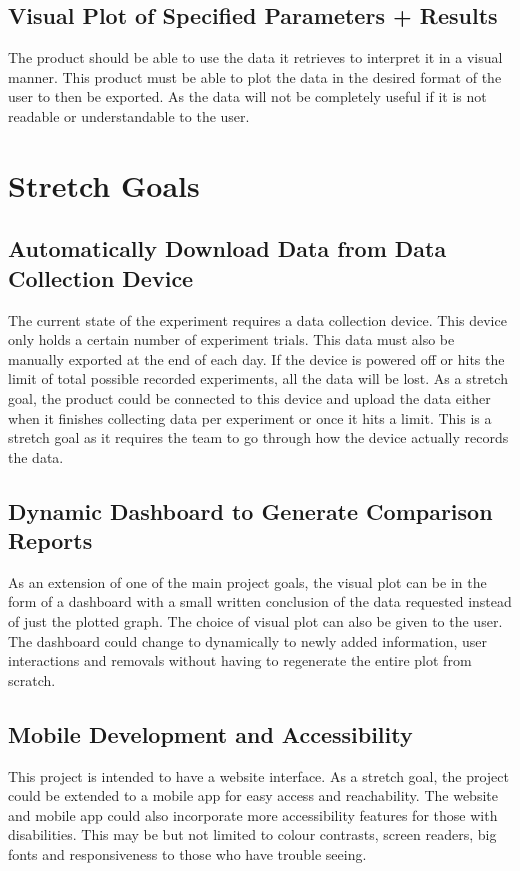 \documentclass{article}
\begin{document}
\subsection*{Visual Plot of Specified Parameters + Results}
The product should be able to use the data it retrieves to interpret it in a
visual manner. This product must be able to plot the data in the desired format
of the user to then be exported. As the data will not be completely useful if it
is not readable or understandable to the user.

\section{Stretch Goals}
\subsection*{Automatically Download Data from Data Collection Device}
The current state of the experiment requires a data collection device. This
device only holds a certain number of experiment trials. This data must also be
manually exported at the end of each day. If the device is powered off or hits
the limit of total possible recorded experiments, all the data will be lost. As
a stretch goal, the product could be connected to this device and upload the
data either when it finishes collecting data per experiment or once it hits a
limit. This is a stretch goal as it requires the team to go through how the
device actually records the data.

\subsection*{Dynamic Dashboard to Generate Comparison Reports}
As an extension of one of the main project goals, the visual plot can be in the
form of a dashboard with a small written conclusion of the data requested
instead of just the plotted graph. The choice of visual plot can also be given
to the user. The dashboard could change to dynamically to newly added
information, user interactions and removals without having to regenerate the
entire plot from scratch.  

\subsection*{Mobile Development and Accessibility}
This project is intended to have a website interface. As a stretch goal, the
project could be extended to a mobile app for easy access and reachability. The
website and mobile app could also incorporate more accessibility features for
those with disabilities. This may be but not limited to colour contrasts, screen
readers, big fonts and responsiveness to those who have trouble seeing.
 
\end{document}

